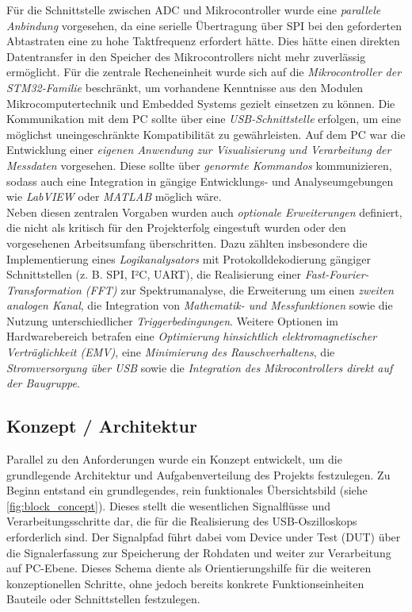 \documentclass[a4paper, portrait, 12pt]{scrartcl} %
\begin{document}
Für die Schnittstelle zwischen ADC und Mikrocontroller wurde eine \emph{parallele Anbindung} vorgesehen, da eine serielle Übertragung über SPI bei den geforderten Abtastraten eine zu hohe Taktfrequenz erfordert hätte. Dies hätte einen direkten Datentransfer in den Speicher des Mikrocontrollers nicht mehr zuverlässig ermöglicht. Für die zentrale Recheneinheit wurde sich auf die \emph{Mikrocontroller der STM32-Familie} beschränkt, um vorhandene Kenntnisse aus den Modulen Mikrocomputertechnik und Embedded Systems gezielt einsetzen zu können. Die Kommunikation mit dem PC sollte über eine \emph{USB-Schnittstelle} erfolgen, um eine möglichst uneingeschränkte Kompatibilität zu gewährleisten. Auf dem PC war die Entwicklung einer \emph{eigenen Anwendung zur Visualisierung und Verarbeitung der Messdaten} vorgesehen. Diese sollte über \emph{genormte Kommandos} kommunizieren, sodass auch eine Integration in gängige Entwicklungs- und Analyseumgebungen wie \emph{LabVIEW} oder \emph{MATLAB} möglich wäre.\\

Neben diesen zentralen Vorgaben wurden auch \emph{optionale Erweiterungen} definiert, die nicht als kritisch für den Projekterfolg eingestuft wurden oder den vorgesehenen Arbeitsumfang überschritten. Dazu zählten insbesondere die Implementierung eines \emph{Logikanalysators} mit Protokolldekodierung gängiger Schnittstellen (z. B. SPI, I²C, UART), die Realisierung einer \emph{Fast-Fourier-Transformation (FFT)} zur Spektrumanalyse, die Erweiterung um einen \emph{zweiten analogen Kanal}, die Integration von \emph{Mathematik- und Messfunktionen} sowie die Nutzung unterschiedlicher \emph{Triggerbedingungen}. Weitere Optionen im Hardwarebereich betrafen eine \emph{Optimierung hinsichtlich elektromagnetischer Verträglichkeit (EMV)}, eine \emph{Minimierung des Rauschverhaltens}, die \emph{Stromversorgung über USB} sowie die \emph{Integration des Mikrocontrollers direkt auf der Baugruppe}.

\subsection{Konzept / Architektur}
Parallel zu den Anforderungen wurde ein Konzept entwickelt, um die grundlegende Architektur und Aufgabenverteilung des Projekts festzulegen. Zu Beginn entstand ein grundlegendes, rein funktionales Übersichtsbild (siehe \autoref{fig:block_concept}). Dieses stellt die wesentlichen Signalflüsse und Verarbeitungsschritte dar, die für die Realisierung des USB-Oszilloskops erforderlich sind. Der Signalpfad führt dabei vom Device under Test (DUT) über die Signalerfassung zur Speicherung der Rohdaten und weiter zur Verarbeitung auf PC-Ebene. Dieses Schema diente als Orientierungshilfe für die weiteren konzeptionellen Schritte, ohne jedoch bereits konkrete Funktionseinheiten Bauteile oder Schnittstellen festzulegen.\\
\end{document}
